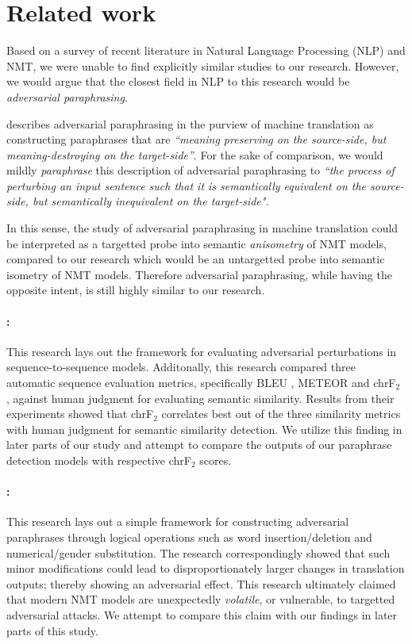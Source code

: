 \documentclass[11pt,a4paper]{article}
\begin{document}
\section{Related work}

Based on a survey of recent literature in Natural Language Processing (NLP) and NMT, we were unable to find explicitly similar studies to our research. However, we would argue that the closest field in NLP to this research would be \textit{adversarial paraphrasing}.

\citet{michel2019evaluation} describes adversarial paraphrasing in the purview of machine translation as constructing paraphrases that are \textit{``meaning preserving on the source-side, but meaning-destroying on the target-side''}. For the sake of comparison, we would mildly \textit{paraphrase} this description of adversarial paraphrasing to \textit{``the process of perturbing an input sentence such that it is semantically equivalent on the source-side, but semantically inequivalent on the target-side"}.

In this sense, the study of adversarial paraphrasing in machine translation could be interpreted as a targetted probe into semantic \textit{anisometry} of NMT models, compared to our research which would be an untargetted probe into semantic isometry of NMT models. Therefore adversarial paraphrasing, while having the opposite intent, is still highly similar to our research.

\paragraph{\citet{michel2019evaluation}:} This research lays out the framework for evaluating adversarial perturbations in sequence-to-sequence models. Additonally, this research compared three automatic sequence evaluation metrics, specifically BLEU \cite{papineni2002bleu}, METEOR \cite{denkowski2014meteor} and chrF$_2$ \cite{popovic2015chrf}, against human judgment for evaluating semantic similarity. Results from their experiments showed that chrF$_2$ correlates best out of the three similarity metrics with human judgment for semantic similarity detection. We utilize this finding in later parts of our study and attempt to compare the outputs of our paraphrase detection models with respective chrF$_2$ scores.

\paragraph{\citet{fadaee2020unreasonable}:} This research lays out a simple framework for constructing adversarial paraphrases through logical operations such as word insertion/deletion and numerical/gender substitution. The research correspondingly showed that such minor modifications could lead to disproportionately larger changes in translation outputs; thereby showing an adversarial effect. This research ultimately claimed that modern NMT models are unexpectedly \textit{volatile}, or vulnerable, to targetted adversarial attacks. We attempt to compare this claim with our findings in later parts of this study. 
\end{document}
